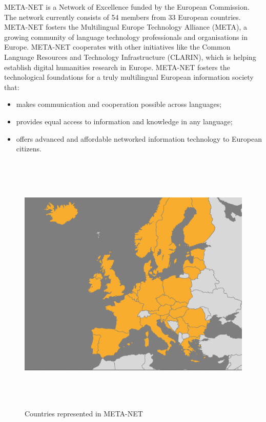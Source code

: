 \documentclass[]{../metanetpaper}
\begin{document}
\clearpage


\begin{multicols}{2}
META-NET is a Network of Excellence funded by the European Commission. The network currently consists of 54 members from 33 European countries. META-NET fosters the Multilingual Europe Technology Alliance (META), a growing community of language technology professionals and organisations in Europe. META-NET cooperates with other initiatives like the Common Language Resources and Technology Infrastructure (CLARIN), which is helping establish digital humanities research in Europe. META-NET fosters the technological foundations for a truly multilingual European information society that:

\begin{itemize}
\item makes communication and cooperation possible across languages;
\item provides equal access to information and knowledge in any language;
\item offers advanced and affordable networked information technology to European citizens.
\end{itemize}

\begin{figure}[!ht]
\begin{center}
  \includegraphics[height=5.0in]{../_media/french/french_pix10_europa_map.png}
  \caption{Countries represented in META-NET}
  \label{fig:metanet_countries}
\end{center}
\end{figure}


\end{multicols}
\end{document}

